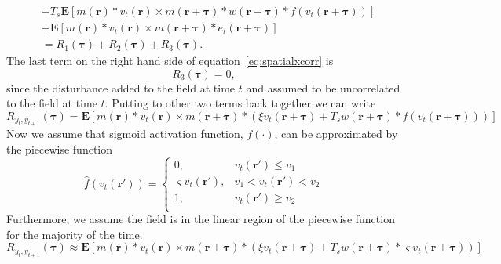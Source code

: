 \documentclass[review,authoryear,3p]{elsarticle}
\begin{document}
{\begin{align}
	&+ T_s\mathbf{E}\left[ m\left(\mathbf{r}\right) \ast v_t\left(\mathbf{r}\right) \times m\left(\mathbf{r}+\boldsymbol{\tau}\right) \ast w\left(\mathbf{r}+\boldsymbol{\tau}\right) \ast f\left(v_t\left(\mathbf{r}+\boldsymbol{\tau}\right)\right) \right] \nonumber \\
	&+ \mathbf{E}\left[ m\left(\mathbf{r}\right) \ast v_t\left(\mathbf{r}\right) \times m\left(\mathbf{r}+\boldsymbol{\tau}\right) \ast e_t\left(\mathbf{r}+\boldsymbol{\tau}\right) \right]
	\\
	&= R_1(\boldsymbol{\tau}) + R_2(\boldsymbol{\tau}) + R_3(\boldsymbol{\tau}).\label{eq:spatialxcorr} 
\end{align}
The last term on the right hand side of equation~\ref{eq:spatialxcorr} is
\begin{equation}
	R_3(\boldsymbol{\tau}) = 0,
\end{equation}
since the disturbance added to the field at time $t$ and assumed to be uncorrelated to the field at time $t$. Putting to other two terms back together we can write
\begin{equation}
	R_{y_{t},y_{t+1}}(\boldsymbol{\tau}) = \mathbf{E}\left[ m\left(\mathbf{r}\right) \ast v_t\left(\mathbf{r}\right) \times m\left(\mathbf{r}+\boldsymbol{\tau}\right) \ast \left(\xi v_t\left(\mathbf{r}+\boldsymbol{\tau}\right) + T_s w\left(\mathbf{r}+\boldsymbol{\tau}\right) \ast f\left(v_t\left(\mathbf{r}+\boldsymbol{\tau}\right)\right) \right) \right]
\end{equation}
Now we assume that sigmoid activation function, $f(\cdot)$, can be approximated by the piecewise function
\begin{equation}
	\hat{f}(v_t(\mathbf{r}')) = \left\{ \begin{array}{ll}
		0, & v_t(\mathbf{r}') \le v_1 \\
		\varsigma v_t(\mathbf{r}'), &  v_1 < v_t(\mathbf{r}') < v_2 \\
		1, & v_t(\mathbf{r}') \ge v_2 \\ 
		\end{array}\right.
\end{equation}
Furthermore, we assume the field is in the linear region of the piecewise function for the majority of the time. 
\begin{equation}
	R_{y_{t},y_{t+1}}(\boldsymbol{\tau}) \approx \mathbf{E}\left[ m\left(\mathbf{r}\right) \ast v_t\left(\mathbf{r}\right) \times m\left(\mathbf{r}+\boldsymbol{\tau}\right) \ast \left(\xi v_t\left(\mathbf{r}+\boldsymbol{\tau}\right) + T_s w\left(\mathbf{r}+\boldsymbol{\tau}\right) \ast \varsigma v_t\left(\mathbf{r}+\boldsymbol{\tau}\right) \right) \right]

\end{equation}}
\end{document}
